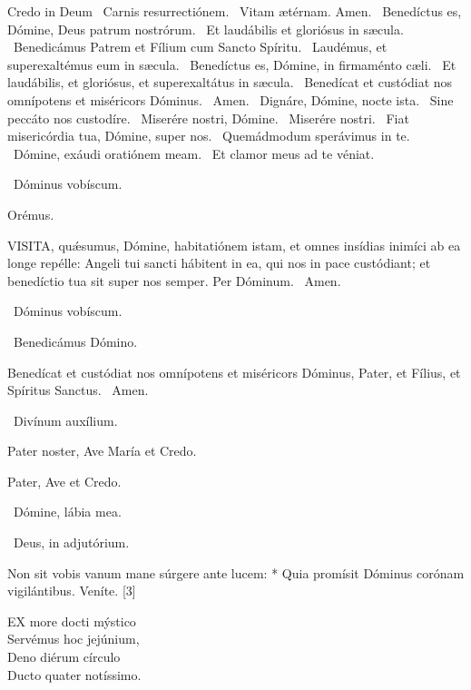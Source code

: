 Credo in Deum  \V\ Carnis resurrectiónem. \R\ Vitam ætérnam. Amen. \V\ Benedíctus es, Dómine, Deus patrum nostrórum. \R\ Et laudábilis et gloriósus in sæcula. \V\ Benedicámus Patrem et Fílium cum Sancto Spíritu. \R\ Laudémus, et superexaltémus eum in sæcula. \V\ Benedíctus es, Dómine, in firmaménto cæli. \R\ Et laudábilis, et gloriósus, et superexaltátus in sæcula. \V\ Benedícat et custódiat nos omnípotens et miséricors Dóminus. \R\ Amen. \V\ Dignáre, Dómine, nocte ista. \R\ Sine peccáto nos custodíre. \V\ Miserére nostri, Dómine. \R\ Miserére nostri. \V\ Fiat misericórdia tua, Dómine, super nos. \R\ Quemádmodum sperávimus in te. \V\ Dómine, exáudi oratiónem meam. \R\ Et clamor meus ad te véniat.

\sectionornament

\V\ Dóminus vobíscum.

Orémus. 

\lettrine[lines=2]{V}{ISITA}, quǽsumus, Dómine, habitatiónem istam, et omnes insídias inimíci ab ea longe repélle: Angeli tui sancti hábitent in ea, qui nos in pace custódiant; et benedíctio tua sit super nos semper. Per Dóminum. \R\ Amen.

\V\ Dóminus vobíscum.

\V\ Benedicámus Dómino.

 Benedícat et custódiat nos omnípotens et miséricors Dóminus, Pater, et Fílius, et Spíritus Sanctus. \R\ Amen.


\V\ Divínum auxílium.

Pater noster, Ave María et Credo.

\sectionornament



Pater, Ave et Credo.

\V\ Dómine, lábia mea.

\V\ Deus, in adjutórium.



 Non sit vobis vanum mane súrgere ante lucem: * Quia promísit Dóminus corónam vigilántibus.  Veníte. [3]


\lettrine[lines=2]{E}{X} more docti mýstico\\
Servémus hoc jejúnium,\\
Deno diérum círculo\\
Ducto quater notíssimo.

